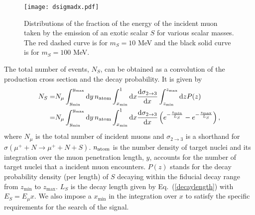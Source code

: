 \documentclass[prd,onecolumn,notitlepage,
nofootinbib,aps,tightenlines,
preprintnumbers,amsmath,amssymb,amsfonts,showpacs,superscriptaddress]{revtex4-1}
\renewcommand{\d}{\text{d}}
\renewcommand{\d}{\text{d}}
\begin{document}
\begin{figure}[t]
\centering
\texttt{[image: dsigmadx.pdf]}
\caption{\label{fig:x} Distributions of the fraction of the energy of the incident muon taken by the emission of an 
exotic scalar $S$ for various scalar masses. The red dashed curve is for $m_S=10$ MeV and the black solid  curve is for $m_S=100$ MeV. }
\end{figure}

The total number of events, $N_S$, can be obtained as a convolution of the 
production cross section and the decay probability. It is given by
\begin{align}
N_S =& N_{\mu} \int_{y_{\min}}^{y_{\max}} \d y\, n_{\rm atom} \int_{x_{\min}}^1 \d x {\d\sigma_{2\to 3}\over \d x}   \int_{z_{\min}}^{z_{\max}} \d z P(z)\\
=& N_{\mu} \int_{y_{\min}}^{y_{\max}} \d y\, n_{\rm atom} \int_{x_{\min}}^1 \d x {\d\sigma_{2\to 3}\over \d x}   \left(e^{-{z_{\min}\over L_S}}-e^{-{z_{\max}\over L_S}}\right),
\label{Ns}
\end{align}
where $N_\mu$ is the total number of incident muons and $\sigma_{2\to 3}$ is a shorthand for $\sigma(\mu^+ + N \to \mu^+ + N + S)$. $n_{\rm atom}$ is the number density of target nuclei and its integration over the muon penetration length, $y$, accounts for the number of target nuclei that a incident muon encounters. $P(z)$ stands for the decay probability density (per length) of $S$ decaying within the fiducial decay range from $z_{\min}$ to $z_{\max}$. $L_S$ is the decay length given by  Eq.~(\ref{decaylength}) with  $E_S = E_\mu x$. We also impose a $x_{\min}$ in the integration over $x$ to satisfy the specific requirements for the search of the signal.
\end{document}
